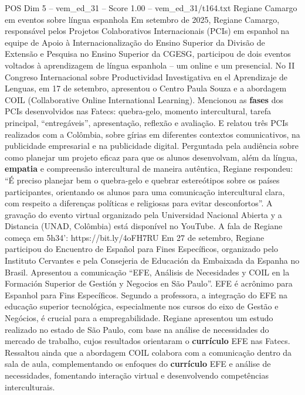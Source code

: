 \begin{textsample}{POS Dim 5 – vem\_ed\_31 – Score 1.00 – vem\_ed\_31/t164.txt}  \label{ex:f5_pos_052}
Regiane Camargo em eventos sobre língua espanhola Em setembro de 2025, Regiane Camargo, responsável pelos Projetos Colaborativos Internacionais (PCIs) em espanhol na equipe de Apoio à Internacionalização do Ensino Superior da Divisão de Extensão e Pesquisa no Ensino Superior da CGESG, participou de dois eventos voltados à aprendizagem de língua espanhola – um online e um presencial.
No II Congreso Internacional sobre Productividad Investigativa en el Aprendizaje de Lenguas, em 17 de setembro, apresentou o Centro Paula Souza e a abordagem COIL (Collaborative Online International Learning).
Mencionou as \textbf{fases} dos PCIs desenvolvidos nas Fatecs: quebra-gelo, momento intercultural, tarefa principal, “entregáveis”, apresentação, reflexão e avaliação.
E relatou três PCIs realizados com a Colômbia, sobre gírias em diferentes contextos comunicativos, na publicidade empresarial e na publicidade digital.
Perguntada pela audiência sobre como planejar um projeto eficaz para que os alunos desenvolvam, além da língua, \textbf{empatia} e compreensão intercultural de maneira autêntica, Regiane respondeu: “É preciso planejar bem o quebra-gelo e quebrar estereótipos sobre os países participantes, orientando os alunos para uma comunicação intercultural clara, com respeito a diferenças políticas e religiosas para evitar desconfortos”.
A gravação do evento virtual organizado pela Universidad Nacional Abierta y a Distancia (UNAD, Colômbia) está disponível no YouTube.
A fala de Regiane começa em 5h34’: https://bit.ly/4oFH7RU Em 27 de setembro, Regiane participou do Encuentro de Español para Fines Específicos, organizado pelo Instituto Cervantes e pela Consejeria de Educación da Embaixada da Espanha no Brasil.
Apresentou a comunicação “EFE, Análisis de Necesidades y COIL en la Formación Superior de Gestión y Negocios en São Paulo”.
EFE é acrônimo para Espanhol para Fins Específicos.
Segundo a professora, a integração do EFE na educação superior tecnológica, especialmente nos cursos do eixo de Gestão e Negócios, é crucial para a empregabilidade.
Regiane apresentou um estudo realizado no estado de São Paulo, com base na análise de necessidades do mercado de trabalho, cujos resultados orientaram o \textbf{currículo} EFE nas Fatecs.
Ressaltou ainda que a abordagem COIL colabora com a comunicação dentro da sala de aula, complementando os enfoques do \textbf{currículo} EFE e análise de necessidades, fomentando interação virtual e desenvolvendo competências interculturais.

\end{textsample}
